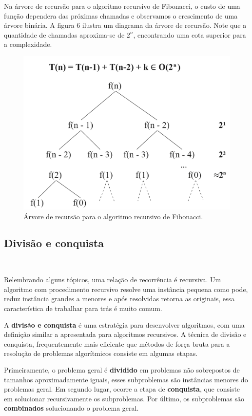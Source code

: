 Na árvore de recursão para o algoritmo recursivo de Fibonacci, o custo de uma função dependera das próximas chamadas e observamos o crescimento de uma árvore binária. A figura 6 ilustra um diagrama da árvore de recursão. Note que a quantidade de chamadas aproxima-se de $2^n$, encontrando uma cota superior para a complexidade.

\begin{figure}
  \centering
  \includegraphics[width=0.7\linewidth]{img/arvorerecursaofib.png}
    \caption{Árvore de recursão para o algoritmo recursivo de Fibonacci.}
    \label{arvorerecursaofib}
\end{figure}

\subsection{Divisão e conquista}
\

Relembrando alguns tópicos, uma relação de recorrência é recursiva. Um algoritmo com procedimento recursivo resolve uma instância pequena como pode, reduz instância grandes a menores e após resolvidas retorna as originais, essa característica de trabalhar para trás é muito comum.

A \textbf{divisão e conquista} é uma estratégia para desenvolver algoritmos, com uma definição similar a apresentada para algoritmos recursivos. A técnica de divisão e conquista, frequentemente mais eficiente que métodos de força bruta para a resolução de problemas algorítmicos consiste em algumas etapas.

Primeiramente, o problema geral é \textbf{dividido} em problemas não sobrepostos de tamanhos aproximadamente iguais, esses subproblemas são instâncias menores do problemas geral. Em segundo lugar, ocorre a etapa de \textbf{conquista}, que consiste em solucionar recursivamente os subproblemas. Por último, os subproblemas são \textbf{combinados} solucionando o problema geral.

